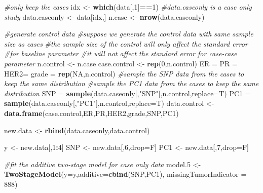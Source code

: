 \documentclass[11pt,]{article}
\newenvironment{Shaded}{\begin{snugshade}}{\end{snugshade}}
\newcommand{\CommentTok}[1]{\textcolor[rgb]{0.56,0.35,0.01}{\textit{#1}}}
\newcommand{\DataTypeTok}[1]{\textcolor[rgb]{0.13,0.29,0.53}{#1}}
\newcommand{\DecValTok}[1]{\textcolor[rgb]{0.00,0.00,0.81}{#1}}
\newcommand{\FloatTok}[1]{\textcolor[rgb]{0.00,0.00,0.81}{#1}}
\newcommand{\KeywordTok}[1]{\textcolor[rgb]{0.13,0.29,0.53}{\textbf{#1}}}
\newcommand{\NormalTok}[1]{#1}
\newcommand{\OperatorTok}[1]{\textcolor[rgb]{0.81,0.36,0.00}{\textbf{#1}}}
\newcommand{\OtherTok}[1]{\textcolor[rgb]{0.56,0.35,0.01}{#1}}
\newcommand{\StringTok}[1]{\textcolor[rgb]{0.31,0.60,0.02}{#1}}
\begin{document}
\begin{Shaded}
\begin{Highlighting}[]
\CommentTok{#only keep the cases}
\NormalTok{idx <-}\StringTok{ }\KeywordTok{which}\NormalTok{(data[,}\DecValTok{1}\NormalTok{]}\OperatorTok{==}\DecValTok{1}\NormalTok{)}
\CommentTok{#data.caseonly is a case only study}
\NormalTok{data.caseonly <-}\StringTok{ }\NormalTok{data[idx,]}
\NormalTok{n.case <-}\StringTok{ }\KeywordTok{nrow}\NormalTok{(data.caseonly)}

\CommentTok{#generate control data}
\CommentTok{#suppose we generate the control data with same sample size as cases}
\CommentTok{#the sample size of the control will only affect the standard error}
\CommentTok{#for baseline parameter}
\CommentTok{#it will not affect the standard error for case-case parameter}
\NormalTok{n.control <-}\StringTok{ }\NormalTok{n.case}
\NormalTok{case.control <-}\StringTok{ }\KeywordTok{rep}\NormalTok{(}\DecValTok{0}\NormalTok{,n.control)}
\NormalTok{ER =}\StringTok{ }\NormalTok{PR =}\StringTok{ }\NormalTok{HER2=}\StringTok{ }\NormalTok{grade =}\StringTok{ }\KeywordTok{rep}\NormalTok{(}\OtherTok{NA}\NormalTok{,n.control)}
\CommentTok{#sample the SNP data from the cases to keep the same distribution}
\CommentTok{#sample the PC1 data from the cases to keep the same distribution}
\NormalTok{SNP =}\StringTok{ }\KeywordTok{sample}\NormalTok{(data.caseonly[,}\StringTok{"SNP"}\NormalTok{],n.control,}\DataTypeTok{replace=}\NormalTok{T)}
\NormalTok{PC1 =}\StringTok{ }\KeywordTok{sample}\NormalTok{(data.caseonly[,}\StringTok{"PC1"}\NormalTok{],n.control,}\DataTypeTok{replace=}\NormalTok{T)}
\NormalTok{data.control <-}\StringTok{ }\KeywordTok{data.frame}\NormalTok{(case.control,ER,PR,HER2,grade,SNP,PC1)}

\NormalTok{new.data <-}\StringTok{ }\KeywordTok{rbind}\NormalTok{(data.caseonly,data.control)}

\NormalTok{y <-}\StringTok{ }\NormalTok{new.data[,}\DecValTok{1}\OperatorTok{:}\DecValTok{4}\NormalTok{]}
\NormalTok{SNP <-}\StringTok{ }\NormalTok{new.data[,}\DecValTok{6}\NormalTok{,drop=F]}
\NormalTok{PC1 <-}\StringTok{ }\NormalTok{new.data[,}\DecValTok{7}\NormalTok{,drop=F]}

\CommentTok{#fit the additive two-stage model for case only data}
\NormalTok{model}\FloatTok{.5}\NormalTok{ <-}\StringTok{ }\KeywordTok{TwoStageModel}\NormalTok{(}\DataTypeTok{y=}\NormalTok{y,}\DataTypeTok{additive=}\KeywordTok{cbind}\NormalTok{(SNP,PC1),}
                         \DataTypeTok{missingTumorIndicator =} \DecValTok{888}\NormalTok{)}
\end{Highlighting}
\end{Shaded}
\end{document}
